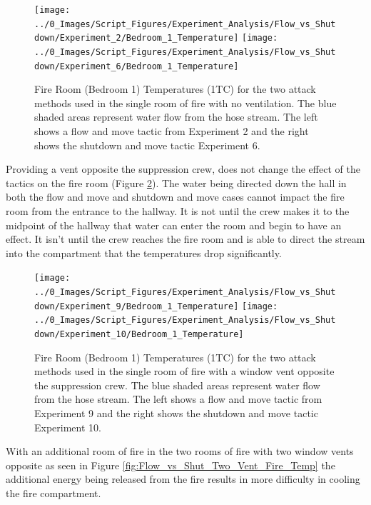 \documentclass[12pt,oneside]{book}
\begin{document}
\begin{figure}[H]
\centering
\texttt{[image: ../0\_Images/Script\_Figures/Experiment\_Analysis/Flow\_vs\_Shutdown/Experiment\_2/Bedroom\_1\_Temperature]}
\texttt{[image: ../0\_Images/Script\_Figures/Experiment\_Analysis/Flow\_vs\_Shutdown/Experiment\_6/Bedroom\_1\_Temperature]}
\caption[Bedroom 1 Temp. - No Vent - Flow \& Move vs. Shutdown \& Move]{Fire Room (Bedroom 1) Temperatures (1TC) for the two attack methods used in the single room of fire with no ventilation. The blue shaded areas represent water flow from the hose stream. The left shows a flow and move tactic from Experiment 2 and the right shows the shutdown and move tactic Experiment 6.}
\label{fig:Flow_vs_Shut_Single_No_Vent_Fire_Temp}
\end{figure}

Providing a vent opposite the suppression crew, does not change the effect of the tactics on the fire room (Figure \ref{fig:Flow_vs_Shut_Single_Vent_Fire_Temp}).  The water being directed down the hall in both the flow and move and shutdown and move cases cannot impact the fire room from the entrance to the hallway. It is not until the crew makes it to the midpoint of the hallway that water can enter the room and begin to have an effect. It isn't until the crew reaches the fire room and is able to direct the stream into the compartment that the temperatures drop significantly.  

\begin{figure}[H]
\centering
\texttt{[image: ../0\_Images/Script\_Figures/Experiment\_Analysis/Flow\_vs\_Shutdown/Experiment\_9/Bedroom\_1\_Temperature]}
\texttt{[image: ../0\_Images/Script\_Figures/Experiment\_Analysis/Flow\_vs\_Shutdown/Experiment\_10/Bedroom\_1\_Temperature]}
\caption[Bedroom 1 Temp. - Single Vent - Flow \& Move vs. Shutdown \& Move]{Fire Room (Bedroom 1) Temperatures (1TC) for the two attack methods used in the single room of fire with a window vent opposite the suppression crew. The blue shaded areas represent water flow from the hose stream. The left shows a flow and move tactic from Experiment 9 and the right shows the shutdown and move tactic Experiment 10.}
\label{fig:Flow_vs_Shut_Single_Vent_Fire_Temp}
\end{figure}

With an additional room of fire in the two rooms of fire with two window vents opposite as seen in Figure \ref{fig:Flow_vs_Shut_Two_Vent_Fire_Temp} the additional energy being released from the fire results in more difficulty in cooling the fire compartment.  
\end{document}
